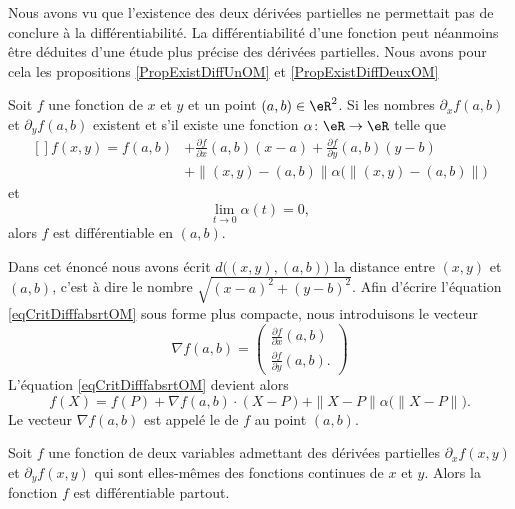 Nous avons vu que l'existence des deux dérivées partielles ne permettait pas de conclure à la différentiabilité. La différentiabilité d'une fonction peut néanmoins être déduites d'une étude plus précise des dérivées partielles. Nous avons pour cela les propositions \ref{PropExistDiffUnOM} et \ref{PropExistDiffDeuxOM}

\begin{proposition} \label{PropExistDiffUnOM}
    Soit $f$ une fonction de $x$ et $y$ et un point $(a,b)\in\eR^2$. Si les nombres $\partial_xf(a,b)$ et $\partial_yf(a,b)$ existent et s'il existe une fonction $\alpha\colon \eR\to \eR$ telle que
    \begin{equation}        \label{eqCritDifffabsrtOM}
        \begin{aligned}[]
            f(x,y)=f(a,b)&+\frac{ \partial f }{ \partial x }(a,b)(x-a)+\frac{ \partial f }{ \partial y }(a,b)(y-b)\\
            &+\| (x,y)-(a,b) \| \alpha\Big( \| (x,y)-(a,b) \| \Big)
        \end{aligned}
    \end{equation}
    et
    \begin{equation}
        \lim_{t\to 0} \alpha(t)=0,
    \end{equation}
    alors $f$ est différentiable en $(a,b)$.
\end{proposition}
Dans cet énoncé nous avons écrit $d\big( (x,y),(a,b) \big)$ la distance entre $(x,y)$ et $(a,b)$, c'est à dire le nombre $\sqrt{(x-a)^2+(y-b)^2}$. Afin d'écrire l'équation \eqref{eqCritDifffabsrtOM} sous forme plus compacte, nous introduisons le vecteur
\begin{equation}
    \nabla f(a,b)=\begin{pmatrix}
        \frac{ \partial f }{ \partial x }(a,b)    \\ 
        \frac{ \partial f }{ \partial y }(a,b).    
    \end{pmatrix}
\end{equation}
L'équation \eqref{eqCritDifffabsrtOM} devient alors
\begin{equation}        \label{EqdiffCompOM}
    f(X)=f(P)+\nabla f(a,b)\cdot (X-P)+\| X-P \|\alpha\big( \| X-P \| \big).
\end{equation}
Le vecteur $\nabla f(a,b)$ est appelé le  de $f$ au point $(a,b)$.


\begin{proposition} \label{PropExistDiffDeuxOM}
    Soit $f$ une fonction de deux variables admettant des dérivées partielles $\partial_xf(x,y)$ et $\partial_yf(x,y)$ qui sont elles-mêmes des fonctions continues de $x$ et $y$. Alors la fonction $f$ est différentiable partout.
\end{proposition}

